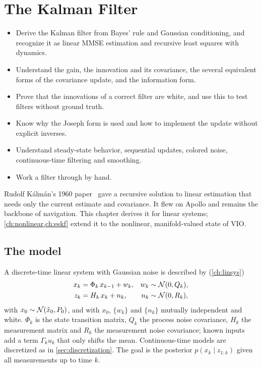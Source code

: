 \chapter{The Kalman Filter}
\label{ch:kf}

\begin{objectives}
\begin{itemize}
  \item Derive the Kalman filter from Bayes' rule and Gaussian conditioning, and recognize it as linear MMSE estimation and recursive
        least squares with dynamics.
  \item Understand the gain, the innovation and its covariance, the several equivalent forms of the covariance update, and the information form.
  \item Prove that the innovations of a correct filter are white, and use this to test filters without ground truth.
  \item Know why the Joseph form is used and how to implement the update without explicit inverses.
  \item Understand steady-state behavior, sequential updates, colored noise, continuous-time filtering and smoothing.
  \item Work a filter through by hand.
\end{itemize}
\end{objectives}

Rudolf Kálmán's 1960 paper~\cite{kalman1960} gave a recursive solution to linear estimation that needs only the current estimate and covariance.
It flew on Apollo and remains the backbone of navigation. This chapter derives it for linear systems; \cref{ch:nonlinear,ch:eskf} extend it to the
nonlinear, manifold-valued state of VIO.

\section{The model}

A discrete-time linear system with Gaussian noise is described by (\cref{ch:linsys})
\begin{align}
  x_k &= \Phi_{k}\, x_{k-1} + w_k, & w_k &\sim \mathcal{N}(0, Q_k), \label{eq:lin-process}\\
  z_k &= H_k\, x_k + n_k, & n_k &\sim \mathcal{N}(0, R_k), \label{eq:lin-meas}
\end{align}
with $x_0 \sim \mathcal{N}(\hat x_0, P_0)$, and with $x_0$, $\{w_k\}$ and $\{n_k\}$ mutually independent and white. $\Phi_k$ is the state transition matrix, $Q_k$ the
process noise covariance, $H_k$ the measurement matrix and $R_k$ the measurement noise covariance; known inputs add a term $\Gamma_ku_k$ that only shifts
the mean. Continuous-time models are discretized as in \cref{sec:discretization}. The goal is the posterior $p(x_k \mid z_{1:k})$ given all
measurements up to time $k$.


